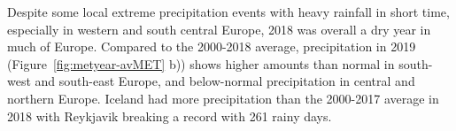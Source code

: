 Despite some local extreme precipitation events with heavy rainfall in short time, especially in western and south central Europe, 2018 was overall a dry year in much of Europe. Compared to the 2000-2018 average, precipitation in 2019  (Figure~\ref{fig:metyear-avMET} b)) shows higher amounts than normal in south-west and south-east Europe, and below-normal precipitation in central and northern Europe. Iceland had more precipitation than the 2000-2017 average in 2018 with Reykjavik breaking a record with 261 rainy days.

\begin{figure}[h]
  \centering 

\end{figure}
